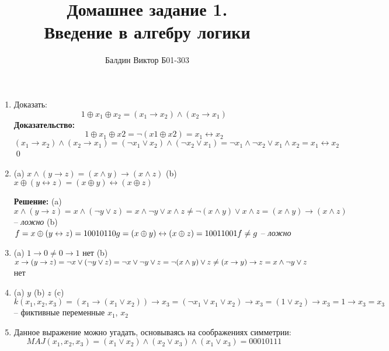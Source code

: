 \documentclass[12pt]{article}
\title{Домашнее задание 1. \\ Введение в алгебру логики}
\author{Балдин Виктор Б01-303}
\begin{document}
    \maketitle

    \begin{enumerate}
        \item Доказать:
            \[1\oplus x_1 \oplus x_2 = (x_1 \to x_2) \wedge (x_2 \to x_1)\]
        \textbf{Доказательство: }
        \[1 \oplus x_1 \oplus x2 = \lnot(x1 \oplus x2) = x_1\leftrightarrow
        x_2\]
        \[ (x_1 \to x_2) \wedge (x_2 \to x_1) = (\lnot x_1 
        \vee x_2) \wedge (\lnot x_2 \vee x_1) = \lnot 
        x_1 \wedge \lnot x_2 \vee x_1 \wedge x_2 = x_1 \leftrightarrow x_2\]
        \qed
        
        \item
        \subitem (a) \( x \wedge (y \to z) = (x \wedge y) \to
        (x \wedge z) \)
        \subitem (b) \( x \oplus (y \leftrightarrow z) = (x \oplus y) 
        \leftrightarrow (x \oplus z) \)

        \textbf{Решение:}
        \subitem (a) \( x \wedge (y \to z) = x \wedge (\lnot y \vee z)
        = x \wedge \lnot y \vee x \wedge z \neq \lnot(x \wedge y) \vee x \wedge
        z = (x \wedge y) \to (x \wedge z)\) -- \textit{ложно}
        \subitem (b)
        \( f = x \oplus (y \leftrightarrow z) = 10010110 \\
           g = (x \oplus y) \leftrightarrow (x \oplus z) = 10011001 \\
           f \neq g
        \) -- \textit{ложно}
        
        \item 
        \subitem (a) \( 1 \to 0 \neq 0 \to 1\) нет
        \subitem (b) \( x \to (y \to z) = \lnot x \vee (\lnot y \vee z)
        = \lnot x \vee \lnot y \vee z = \lnot (x \wedge y) \vee z \neq \\
        (x \to y) \to z = x \wedge \lnot y \vee z \)
        нет

        \item 
        \subitem (a) \( y \)
        \subitem (b) \( z \)
        \subitem (c) \( k(x_1, x_2, x_3) =
        (x_1 \to (x_1 \vee x_2)) \to x_3 = (\lnot x_1 \vee x_1 \vee x_2)
        \to x_3 = (1 \vee x_2) \to x_3 = 1 \to x_3 = x_3\) -- фиктивные
        переменные $x_1$, $x_2$

        \item Данное выражение можно угадать, основываясь на 
        соображениях симметрии:
        \[ MAJ(x_1, x_2, x_3) = (x_1 \vee x_2) \wedge (x_2 \vee x_3)
        \wedge (x_1 \vee x_3) = 00010111\]


\end{enumerate}
\end{document}
